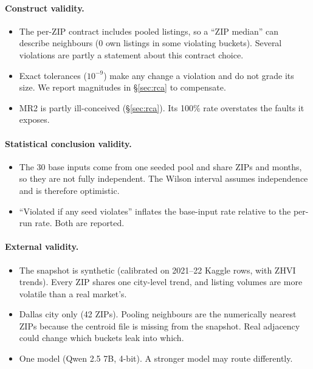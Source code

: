 \documentclass[11pt,a4paper]{article}
\begin{document}
\paragraph{Construct validity.}
\begin{itemize}
  \item The per-ZIP contract includes pooled listings, so a ``ZIP median'' can describe neighbours (0 own listings in
  some violating buckets). Several violations are partly a statement about this contract choice.
  \item Exact tolerances ($10^{-9}$) make any change a violation and do not grade its size. We report magnitudes in
  \S\ref{sec:rca} to compensate.
  \item MR2 is partly ill-conceived (\S\ref{sec:rca}). Its 100\% rate overstates the faults it exposes.
\end{itemize}
\paragraph{Statistical conclusion validity.}
\begin{itemize}
  \item The 30 base inputs come from one seeded pool and share ZIPs and months, so they are not fully independent.
  The Wilson interval assumes independence and is therefore optimistic.
  \item ``Violated if any seed violates'' inflates the base-input rate relative to the per-run rate. Both are reported.
\end{itemize}
\paragraph{External validity.}
\begin{itemize}
  \item The snapshot is synthetic (calibrated on 2021--22 Kaggle rows, with ZHVI trends). Every ZIP shares one
  city-level trend, and listing volumes are more volatile than a real market's.
  \item Dallas city only (42 ZIPs). Pooling neighbours are the numerically nearest ZIPs because the centroid file is
  missing from the snapshot. Real adjacency could change which buckets leak into which.
  \item One model (Qwen 2.5 7B, 4-bit). A stronger model may route differently.
\end{itemize}

\end{document}
